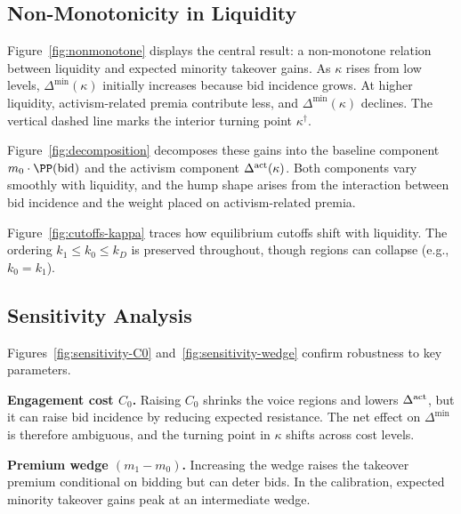 \subsection{Non-Monotonicity in Liquidity}

Figure~\ref{fig:nonmonotone} displays the central result: a non-monotone relation between liquidity and expected minority takeover gains. As $\kappa$ rises from low levels, $\Delta^{\min}(\kappa)$ initially increases because bid incidence grows. At higher liquidity, activism-related premia contribute less, and $\Delta^{\min}(\kappa)$ declines. The vertical dashed line marks the interior turning point $\kappa^{\dagger}$.

Figure~\ref{fig:decomposition} decomposes these gains into the baseline component $m_0 \cdot \PP(\textup{bid})$ and the activism component $\Delta^{\textup{act}}(\kappa)$. Both components vary smoothly with liquidity, and the hump shape arises from the interaction between bid incidence and the weight placed on activism-related premia.

Figure~\ref{fig:cutoffs-kappa} traces how equilibrium cutoffs shift with liquidity. The ordering $k_1 \le k_0 \le k_D$ is preserved throughout, though regions can collapse (e.g., $k_0=k_1$).

\subsection{Sensitivity Analysis}

Figures~\ref{fig:sensitivity-C0} and~\ref{fig:sensitivity-wedge} confirm robustness to key parameters.

\textbf{Engagement cost $C_0$.} Raising $C_0$ shrinks the voice regions and lowers $\Delta^{\textup{act}}$, but it can raise bid incidence by reducing expected resistance. The net effect on $\Delta^{\min}$ is therefore ambiguous, and the turning point in $\kappa$ shifts across cost levels.

\textbf{Premium wedge $(m_1 - m_0)$.} Increasing the wedge raises the takeover premium conditional on bidding but can deter bids. In the calibration, expected minority takeover gains peak at an intermediate wedge.

